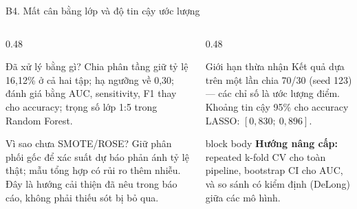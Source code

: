 \documentclass[10pt,aspectratio=169]{beamer}
\begin{document}
\begin{frame}{B4. Mất cân bằng lớp và độ tin cậy ước lượng}
  \begin{columns}[T,onlytextwidth]
    \begin{column}{0.48\textwidth}
      \begin{block}{Đã xử lý bằng gì?}
        \small
        Chia phân tầng giữ tỷ lệ 16,12\% ở cả hai tập; hạ ngưỡng về 0,30;
        đánh giá bằng AUC, sensitivity, F1 thay cho accuracy;
        trọng số lớp 1:5 trong Random Forest.
      \end{block}
      \vspace{0.14cm}
      \begin{block}{Vì sao chưa SMOTE/ROSE?}
        \small
        Giữ phân phối gốc để xác suất dự báo phản ánh tỷ lệ thật;
        mẫu tổng hợp có rủi ro thêm nhiễu. Đây là hướng cải thiện
        đã nêu trong báo cáo, không phải thiếu sót bị bỏ qua.
      \end{block}
    \end{column}
    \begin{column}{0.48\textwidth}
      \begin{block}{Giới hạn thừa nhận}
        \small
        Kết quả dựa trên một lần chia 70/30 (seed 123) --- các chỉ số là
        ước lượng điểm. Khoảng tin cậy 95\% cho accuracy LASSO:
        $[0{,}830;\ 0{,}896]$.
      \end{block}
      \vspace{0.14cm}
      \begin{beamercolorbox}[sep=0.15cm,rounded=true]{block body}
        \small
        \textbf{Hướng nâng cấp:} repeated k-fold CV cho toàn pipeline,
        bootstrap CI cho AUC, và so sánh có kiểm định (DeLong) giữa các
        mô hình.
      \end{beamercolorbox}
    \end{column}
  \end{columns}
\end{frame}
\end{document}
